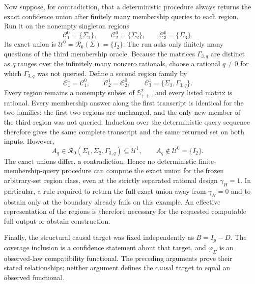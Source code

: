 Now suppose, for contradiction, that a deterministic procedure always returns the exact confidence union after finitely many membership queries to each region.  Run it on the nonempty singleton regions
\[
 \mathcal C^0_1=\{\Sigma_1\},\qquad
 \mathcal C^0_2=\{\Sigma_2\},\qquad
 \mathcal C^0_3=\{\Sigma_3\}.
\]
Its exact union is \(\mathcal U^0=\mathcal R_0(\Sigma)=\{I_2\}\).  The run asks only finitely many questions of the third membership oracle.  Because the matrices \(\Gamma_{3,q}\) are distinct as \(q\) ranges over the infinitely many nonzero rationals, choose a rational \(q\neq0\) for which \(\Gamma_{3,q}\) was not queried.  Define a second region family by
\[
 \mathcal C^1_1=\mathcal C^0_1,\qquad
 \mathcal C^1_2=\mathcal C^0_2,\qquad
 \mathcal C^1_3=\{\Sigma_3,\Gamma_{3,q}\}.
\]
Every region remains a nonempty subset of \(\mathbb S_{++}^2\), and every listed matrix is rational.  Every membership answer along the first transcript is identical for the two families: the first two regions are unchanged, and the only new member of the third region was not queried.  Induction over the deterministic query sequence therefore gives the same complete transcript and the same returned set on both inputs.  However,
\[
 A_q\in\mathcal R_0(\Sigma_1,\Sigma_2,\Gamma_{3,q})
 \subseteq\mathcal U^1,
 \qquad
 A_q\notin\mathcal U^0=\{I_2\}.
\]
The exact unions differ, a contradiction.  Hence no deterministic finite-membership-query procedure can compute the exact union for the frozen arbitrary-set region class, even at the strictly separated rational design \(\gamma_H=1\).  In particular, a rule required to return the full exact union away from \(\gamma_H=0\) and to abstain only at the boundary already fails on this example.  An effective representation of the regions is therefore necessary for the requested computable full-output-or-abstain construction.

Finally, the structural causal target was fixed independently as \(B=I_p-D\).  The coverage inclusion is a confidence statement about that target, and \(\varphi_\Sigma\) is an observed-law compatibility functional.  The preceding arguments prove their stated relationships; neither argument defines the causal target to equal an observed functional.